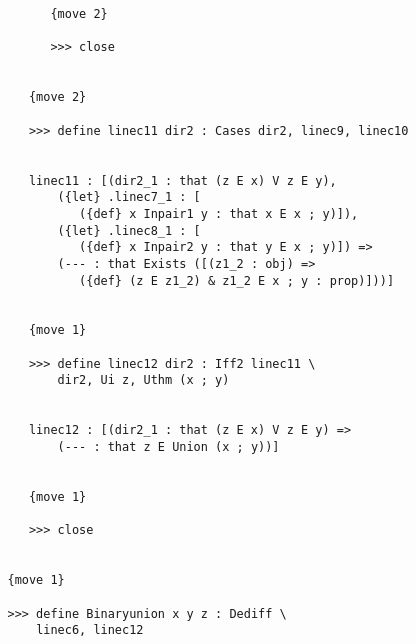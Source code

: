 \documentclass[12pt]{article}
\begin{document}
\begin{verbatim}
         {move 2}

         >>> close


      {move 2}

      >>> define linec11 dir2 : Cases dir2, linec9, linec10


      linec11 : [(dir2_1 : that (z E x) V z E y), 
          ({let} .linec7_1 : [
             ({def} x Inpair1 y : that x E x ; y)]), 
          ({let} .linec8_1 : [
             ({def} x Inpair2 y : that y E x ; y)]) => 
          (--- : that Exists ([(z1_2 : obj) => 
             ({def} (z E z1_2) & z1_2 E x ; y : prop)]))]


      {move 1}

      >>> define linec12 dir2 : Iff2 linec11 \
          dir2, Ui z, Uthm (x ; y)


      linec12 : [(dir2_1 : that (z E x) V z E y) => 
          (--- : that z E Union (x ; y))]


      {move 1}

      >>> close


   {move 1}

   >>> define Binaryunion x y z : Dediff \
       linec6, linec12



\end{verbatim}
\end{document}
